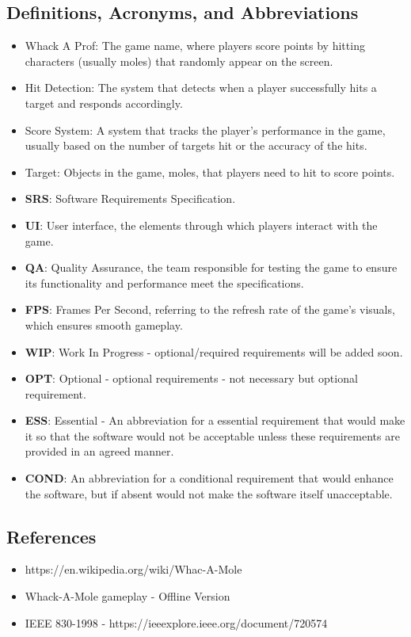 \documentclass{article}
\begin{document}
\subsection{Definitions, Acronyms, and Abbreviations}
\begin{itemize}
    \item Whack A Prof: The game name, where players score points by hitting characters (usually moles) that randomly appear on the screen.
    \item Hit Detection: The system that detects when a player successfully hits a target and responds accordingly.
    \item Score System: A system that tracks the player's performance in the game, usually based on the number of targets hit or the accuracy of the hits.
    \item Target: Objects in the game, moles, that players need to hit to score points.
    \item \textbf{SRS}: Software Requirements Specification.
    \item \textbf{UI}: User interface, the elements through which players interact with the game.
    \item \textbf{QA}: Quality Assurance, the team responsible for testing the game to ensure its functionality and performance meet the specifications.
    \item \textbf{FPS}: Frames Per Second, referring to the refresh rate of the game's visuals, which ensures smooth gameplay.
    \item \textbf{WIP}: Work In Progress - optional/required requirements will be added soon.
    \item \textbf{OPT}: Optional - optional requirements -  not necessary but optional requirement.
    \item \textbf{ESS}: Essential - An abbreviation for a essential requirement that would make it so that the software would not be acceptable unless these requirements are provided in an agreed manner.
    \item \textbf{COND}: An abbreviation for a conditional requirement that would enhance the software, but if absent would not make the software itself unacceptable.

\end{itemize}

\subsection{References}
\begin{itemize}
    \item https://en.wikipedia.org/wiki/Whac-A-Mole
    \item Whack-A-Mole gameplay - Offline Version
    \item IEEE 830-1998 - https://ieeexplore.ieee.org/document/720574 
\end{itemize}
\end{document}
